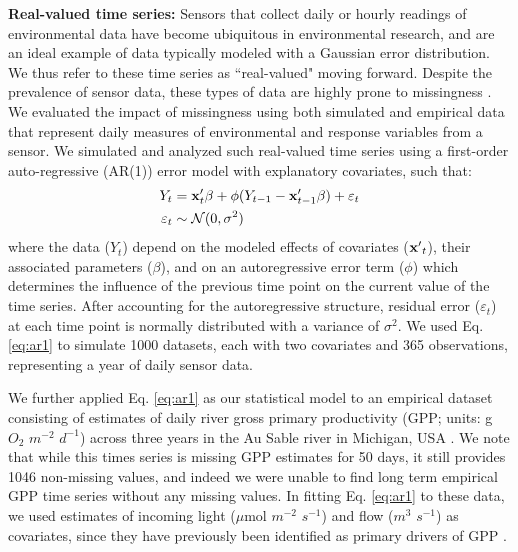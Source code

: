 \documentclass[12pt,english]{article} %
\begin{document}
\begin{linenumbers}
\begin{spacing}{1.9}
\begin{flushleft}
\textbf{Real-valued time series:} Sensors that collect daily or hourly readings of environmental data have become ubiquitous in environmental research, and are an ideal example of data typically modeled with a Gaussian error distribution. We thus refer to these time series as ``real-valued" moving forward. Despite the prevalence of sensor data, these types of data are highly prone to missingness \citep{chen2013ecological}. We evaluated the impact of missingness using both simulated and empirical data that represent daily measures of environmental and response variables from a sensor. We simulated and analyzed such real-valued time series using a first-order auto-regressive (AR(1)) error model with explanatory covariates, such that:
\vspace{-1em}
\begin{subequations}
    \begin{align}\label{eq:ar1}
        Y_t &= {\bf x}'_{t} \beta + \phi (Y_{t-1} - {\bf x}'_{t-1} \beta) + \varepsilon_t \\
        \varepsilon_t &\sim \mathcal{N}(0, \sigma^2)
    \end{align}
    
\end{subequations}
\vspace{-2em}
\noindent where the data ($Y_t$) depend on the modeled effects of covariates (${\bf x'}_t$), their associated parameters ($\beta$), and on an autoregressive error term ($\phi$) which determines the influence of the previous time point on the current value of the time series. After accounting for the autoregressive structure, residual error ($\varepsilon_t$) at each time point is normally distributed with a variance of $\sigma^2$. We used Eq. \ref{eq:ar1} to simulate 1000 datasets, each with two covariates and 365 observations, representing a year of daily sensor data. 


\hspace{1em} We further applied Eq. \ref{eq:ar1} as our statistical model to an empirical dataset consisting of estimates of daily river gross primary productivity (GPP; units: g \(O_2\) \(m^{-2}\) \(d^{-1}\)) across three years in the Au Sable river in Michigan, USA  \citep{appling_metabolic_2018}. We note that while this times series is missing GPP estimates for 50 days, it still provides 1046 non-missing values, and indeed we were unable to find long term empirical GPP time series without any missing values. In fitting Eq. \ref{eq:ar1} to these data, we used estimates of incoming light (\(\mu\)mol \(m^{-2}\) \(s^{-1}\)) and flow (\(m^{3}\) \(s^{-1}\)) as covariates, since they have previously been identified as primary drivers of GPP \citep{bernhardt2022light}. 


\end{flushleft}
\end{spacing}
\end{linenumbers}
\end{document}
